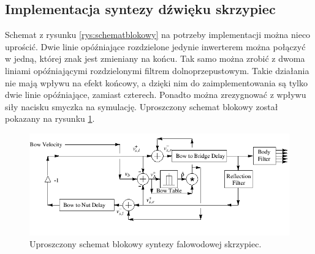 \subsection{Implementacja syntezy dźwięku skrzypiec}
Schemat z rysunku \ref{rys:schematblokowy} na potrzeby implementacji można nieco uprościć. Dwie linie opóźniające rozdzielone jedynie inwerterem można połączyć w jedną, której znak jest zmieniany na końcu. Tak samo można zrobić z dwoma liniami opóźniającymi rozdzielonymi filtrem dolnoprzepustowym. Takie działania nie mają wpływu na efekt końcowy, a dzięki nim do zaimplementowania są tylko dwie linie opóźniające, zamiast czterech. Ponadto można zrezygnować z wpływu siły nacisku smyczka na symulację. Uproszczony schemat blokowy został pokazany na rysunku \ref{rys:model_violin_schemat}.
\begin{figure}[H]
	\centering
	\includegraphics[width=12cm]{grafiki/model_violin_schemat}
	\captionsetup{justification=centering}
	\caption{Uproszczony schemat blokowy syntezy falowodowej skrzypiec.}
	\label{rys:model_violin_schemat}
\end{figure}

